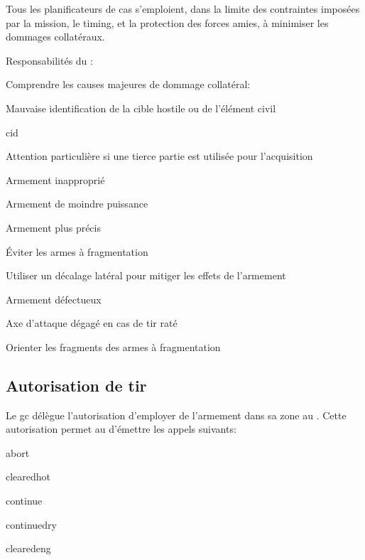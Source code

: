Tous les planificateurs de \gls{cas} s'emploient, dans la limite des contraintes imposées par la mission, le timing, et la protection des forces amies, à minimiser les dommages collatéraux.

Responsabilités du \ja{}:

\e
	\item Comprendre les causes majeures de dommage collatéral:
	\ee
		\item Mauvaise identification de la cible hostile ou de l'élément civil
		\eee
			\item \gls{cid}
			\item Attention particulière si une tierce partie est utilisée pour l'acquisition
		\ed
		\item Armement inapproprié
		\eee
			\item Armement de moindre puissance
			\item Armement plus précis
			\item Éviter les armes à fragmentation
			\item Utiliser un décalage latéral pour mitiger les effets de l'armement
		\ed
		\item Armement défectueux
		\eee
			\item Axe d'attaque dégagé en cas de tir raté
			\item Orienter les fragments des armes à fragmentation
		\ed
	\ed
\ed


\newpage
\subsection{Autorisation de tir}

Le \gls{gc} délègue l'autorisation d'employer de l'armement dans sa zone au \ja{}. Cette autorisation permet au \ja{} d'émettre les appels suivants:


\e
	\item \acrfull{abort} 
	\item \acrfull{clearedhot}
	\item \acrfull{continue}
	\item \acrfull{continuedry}
	\item \acrfull{clearedeng}
\ed

